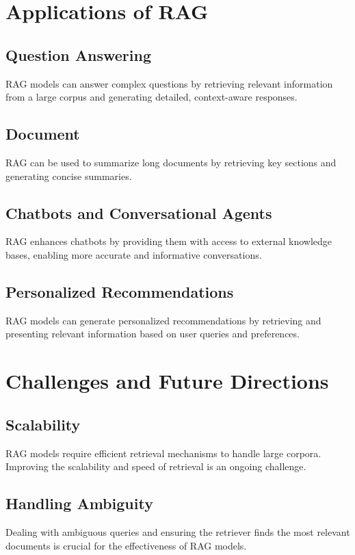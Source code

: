 \section{Applications of RAG}

\subsection{Question Answering}
RAG models can answer complex questions by retrieving relevant information from a large corpus and generating detailed, context-aware responses.

\subsection{Document }
RAG can be used to summarize long documents by retrieving key sections and generating concise summaries.

\subsection{Chatbots and Conversational Agents}
RAG enhances chatbots by providing them with access to external knowledge bases, enabling more accurate and informative conversations.

\subsection{Personalized Recommendations}
RAG models can generate personalized recommendations by retrieving and presenting relevant information based on user queries and preferences.

\section{Challenges and Future Directions}

\subsection{Scalability}
RAG models require efficient retrieval mechanisms to handle large corpora. Improving the scalability and speed of retrieval is an ongoing challenge.

\subsection{Handling Ambiguity}
Dealing with ambiguous queries and ensuring the retriever finds the most relevant documents is crucial for the effectiveness of RAG models.

